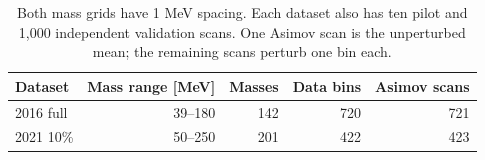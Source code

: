 \begin{table}[H]\centering\small
\begin{tabular}{lrrrr}\toprule
Dataset & Mass range [MeV] & Masses & Data bins & Asimov scans\\\midrule
2016 full & 39--180 & 142 & 720 & 721 \\
2021 10\% & 50--250 & 201 & 422 & 423 \\
\bottomrule\end{tabular}
\caption{Both mass grids have 1 MeV spacing. Each dataset also has ten pilot and 1,000 independent validation scans. One Asimov scan is the unperturbed mean; the remaining scans perturb one bin each.}\end{table}

